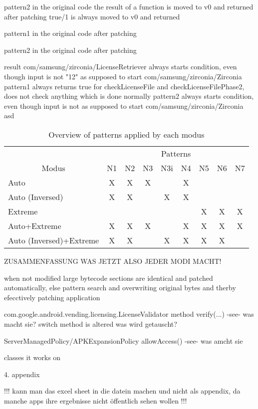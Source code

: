 pattern2
in the original code the result of a function is moved to v0 and returned
after patching true/1 is always moved to v0 and returned



pattern1
in the original code
after patching

pattern2
in the original code
after patching

result
com/samsung/zirconia/LicenseRetriever
always starts condition, even though input is not "12" as supposed to start
com/samsung/zirconia/Zirconia
pattern1
always returns true for checkLicenseFile and checkLicenseFilePhase2, does not check anything which is done normally
pattern2
always starts condition, even though input is not as supposed to start
com/samsung/zirconia/Zirconia
\newline
asd
\begin{table}[h]
\centering
\begin{tabular}{l|cccccccc}
                           & \multicolumn{8}{c}{Patterns}           \\
\multicolumn{1}{c|}{Modus} & N1 & N2 & N3 & N3i & N4 & N5 & N6 & N7 \\ \hline
Auto                       & X  & X  & X  &     & X  &    &    &    \\
Auto (Inversed)            & X  & X  &    & X   & X  &    &    &    \\
Extreme                    &    &    &    &     &    & X  & X  & X  \\
Auto+Extreme               & X  & X  & X  &     & X  & X  & X  & X  \\
Auto (Inversed)+Extreme    & X  & X  &    & X   & X  & X  & X  &
\end{tabular}
\caption{Overview of patterns applied by each modus}
\label{table:patterns}
\end{table}

ZUSAMMENFASSUNG WAS JETZT ALSO JEDER MODI MACHT!



%
when  not modified large bytecode sections are identical and patched automatically, else pattern search and overwriting original bytes and therby efecctively patching application



com.google.android.vending.licensing.LicenseValidator
method verify(...) -see- was macht sie?
switch method is altered
was wird getauscht?


ServerManagedPolicy/APKExpansionPolicy
allowAccess() -see- was amcht sie



\cite{munteanLicense}
%

classes it works on


\cite{samsungZirconia} 4. appendix



!!! kann man das excel sheet in die datein machen und nicht als appendix, da manche apps ihre ergebnisse nicht öffentlich sehen wollen !!!
